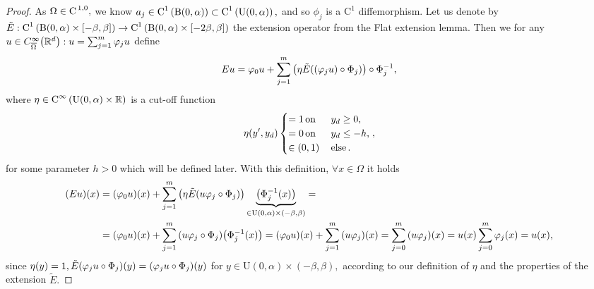 \documentclass{article}
\begin{document}
\begin{proof}
	As $\Omega \in \text{C}^{\!\,\, 1,0},$ we know $a_j \in \text{C}^{1}\!\,\left(\text{B}(0,\alpha) \right)\subset \text{C}^{1}\!\,\left(\text{U}(0,\alpha) \right),$ and so $\phi_j$ is a $\text{C}^1$ diffemorphism. Let us denote by $\tilde{E}: \text{C}^{1}\!\,\left(\text{B}(0,\alpha)\times [-\beta, \beta] \right) \to \text{C}^{1}\!\,\left(\text{B}(0,\alpha)\times [-2 \beta, \beta] \right)$ the extension operator from the Flat extension lemma. Then we for any $u \in C^{\infty}_{\overline{\Omega}}\qty({\mathbb R}^d): u = \sum_{j=1}^m \varphi_j u$ define
	\[
		Eu=\varphi_0 u + \sum_{j=1}^m \qty(\eta \tilde{E}\qty((\varphi_j u) \circ \Phi_j)) \circ \Phi_j^{-1},
	\]
	where $\eta \in \text{C}^{\infty}\!\,\left(\text{U}(0,\alpha)\times {\mathbb R} \right)$ is a cut-off function
	\begin{equation*}
		\eta\qty(y',y_d)  
		\begin{cases}
			=1 \, \text{on} \, &y_d \geq 0,\\
			= 0 \, \text{on} \,& y_d \leq -h, \\
			\in (0,1) \, &\text{else} \,.
		\end{cases},
	\end{equation*}
for some parameter $h>0$ which will be defined later.
With this definition, $\forall x \in \Omega$ it holds
\begin{align*}
	\qty(Eu)(x) &= \qty(\varphi_0 u)(x) + \sum_{j=1}^{m}\qty(\eta \tilde{E}\qty(u \varphi_j \circ \Phi_j))\underbrace{\qty(\Phi_j^{-1}(x))}_{\in \text{U}(0,\alpha)\times \qty(-\beta, \beta)} =\\
	&= \qty(\varphi_0 u)(x) + \sum_{j=1}^m \qty(u \varphi_j \circ \Phi_j)\qty(\Phi_j^{-1}(x)) = \qty(\varphi_0 u)(x) + \sum_{j=1}^m \qty(u \varphi_j)(x) = \sum_{j=0}^m \qty(u \varphi_j)(x) = u(x) \sum_{j=0}^m \varphi_j(x) = u(x),
\end{align*}
since $\eta(y) = 1, \tilde{E}\qty(\varphi_j u \circ \Phi_j) (y) = \qty(\varphi_j u \circ \Phi_j)(y)$ for $y \in \text{U}(0,\alpha) \times (-\beta, \beta), $ according to our definition of $\eta$ and the properties of the extension $\tilde{E}.$


\end{proof}
\end{document}

